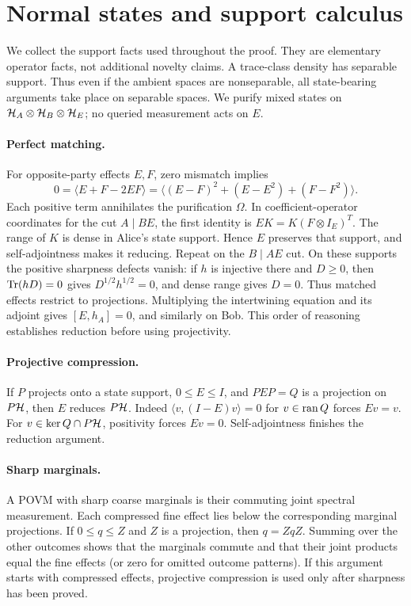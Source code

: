 \section{Normal states and support calculus}\label{sec:support}
We collect the support facts used throughout the proof. They are elementary operator facts, not additional novelty claims. A trace-class density has separable support. Thus even if the ambient spaces are nonseparable, all state-bearing arguments take place on separable spaces. We purify mixed states on $\mathcal H_A\otimes\mathcal H_B\otimes\mathcal H_E$; no queried measurement acts on $E$.

\paragraph{Perfect matching.}
For opposite-party effects $E,F$, zero mismatch implies
\begin{equation}\label{eq:matching}
0=\langle E+F-2EF\rangle
 =\langle(E-F)^2+(E-E^2)+(F-F^2)\rangle.
\end{equation}
Each positive term annihilates the purification $\Omega$. In coefficient-operator coordinates for the cut $A\mid BE$, the first identity is $EK=K(F\otimes I_E)^T$. The range of $K$ is dense in Alice's state support. Hence $E$ preserves that support, and self-adjointness makes it reducing. Repeat on the $B\mid AE$ cut. On these supports the positive sharpness defects vanish: if $h$ is injective there and $D\geq0$, then $\operatorname{Tr}(hD)=0$ gives $D^{1/2}h^{1/2}=0$, and dense range gives $D=0$. Thus matched effects restrict to projections. Multiplying the intertwining equation and its adjoint gives $[E,h_A]=0$, and similarly on Bob. This order of reasoning establishes reduction before using projectivity.

\paragraph{Projective compression.}
If $P$ projects onto a state support, $0\leq E\leq I$, and $PEP=Q$ is a projection on $P\mathcal H$, then $E$ reduces $P\mathcal H$. Indeed $\langle v,(I-E)v\rangle=0$ for $v\in\operatorname{ran} Q$ forces $Ev=v$. For $v\in\ker Q\cap P\mathcal H$, positivity forces $Ev=0$. Self-adjointness finishes the reduction argument.

\paragraph{Sharp marginals.}
A POVM with sharp coarse marginals is their commuting joint spectral measurement. Each compressed fine effect lies below the corresponding marginal projections. If $0\leq q\leq Z$ and $Z$ is a projection, then $q=ZqZ$. Summing over the other outcomes shows that the marginals commute and that their joint products equal the fine effects (or zero for omitted outcome patterns). If this argument starts with compressed effects, projective compression is used only after sharpness has been proved.

